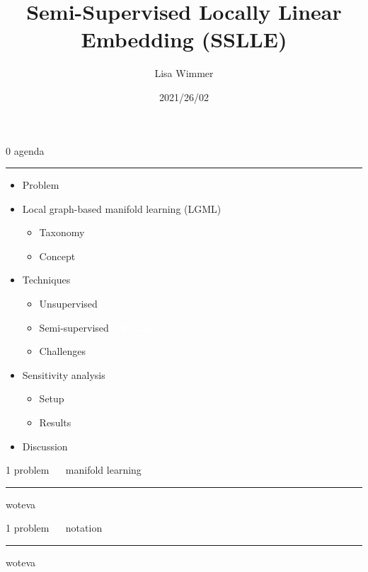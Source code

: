\documentclass[11pt,compress,t,notes=noshow, xcolor=table]{beamer}
\title{Semi-Supervised Locally Linear Embedding (SSLLE)}
\author{Lisa Wimmer}
\date{2021/26/02}
\newcommand{\maketag}[1]{\colorbox{highlightcol}{\textcolor{white}
{\MakeUppercase{#1}}}}
\newcommand{\highlight}[1]{\textcolor{highlightcol}{\textbf{#1}}}
\newcommand{\flexitem}[1]{\item[$\highlight{#1}$]}
\begin{document}


\LARGE
\begin{frame}{\textcolor{gray!90}{0 agenda}}
\normalsize
\vspace{-0.5cm}
\noindent \textcolor{gray!90}{\rule{\textwidth}{1pt}}

\medskip

\begin{itemize}
\flexitem{1} Problem
\flexitem{2} Local graph-based manifold learning (LGML)
\begin{itemize}
  \flexitem{1} Taxonomy
  \flexitem{2} Concept
\end{itemize}
\flexitem{3} Techniques
\begin{itemize}
  \flexitem{1} Unsupervised
  \flexitem{2} Semi-supervised ~ \maketag{SSLLE}
  \flexitem{3} Challenges
\end{itemize}
\flexitem{4} Sensitivity analysis
\begin{itemize}
  \flexitem{1} Setup
  \flexitem{2} Results
\end{itemize}
\flexitem{5} Discussion
\end{itemize}

\end{frame}


\LARGE
\begin{frame}{\textcolor{gray!90}{1 problem} ~~ manifold learning}
\normalsize
\vspace{-0.5cm}
\noindent \textcolor{gray!90}{\rule{\textwidth}{1pt}}


\medskip

woteva

\end{frame}


\LARGE
\begin{frame}{\textcolor{gray!90}{1 problem} ~~ notation}
\normalsize
\vspace{-0.5cm}
\noindent \textcolor{gray!90}{\rule{\textwidth}{1pt}}


\medskip

woteva

\end{frame}
\end{document}
